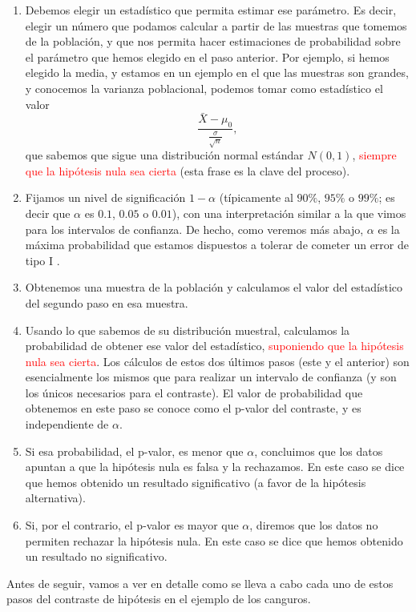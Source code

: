 \begin{itemize}
\begin{enumerate}
         \item  Debemos elegir un estadístico que permita estimar ese parámetro. Es decir, elegir un número que podamos calcular a partir de las muestras que tomemos de la población, y que nos permita hacer estimaciones de probabilidad sobre el parámetro que hemos elegido en el paso anterior. Por ejemplo, si hemos elegido la media, y estamos en un ejemplo en el que las muestras son grandes, y conocemos la varianza poblacional, podemos tomar como estadístico el valor
             \[\dfrac{\bar X-\mu_0}{\frac{\sigma}{\sqrt{n}}},\]
             que sabemos que sigue una distribución normal estándar $N(0,1)$, \textcolor{red}{\sf siempre que la hipótesis nula sea cierta} (esta frase es la clave del proceso).
         \item Fijamos un nivel de significación $1-\alpha$ (típicamente al $90\%$, $95\%$ o $99\%$; es decir que $\alpha$ es $0.1$, $0.05$ o $0.01$), con una interpretación similar a la que vimos para los intervalos de confianza. De hecho, como veremos más abajo, $\alpha$ es la máxima probabilidad que estamos dispuestos a tolerar de cometer un error de tipo I .
         \item Obtenemos una muestra de la población y calculamos el valor del estadístico del segundo paso en esa muestra.
         \item Usando lo que sabemos de su distribución muestral, calculamos la probabilidad de obtener ese valor del estadístico, \textcolor{red}{\sf suponiendo que la hipótesis nula sea cierta}. Los cálculos de estos dos últimos pasos (este y el anterior) son esencialmente los mismos que para realizar un intervalo de confianza (y son los únicos necesarios para el contraste). El valor de probabilidad que obtenemos en este paso se conoce como el {\sf p-valor del contraste}, y es independiente de $\alpha$.
         \item Si esa probabilidad, el p-valor, es menor que $\alpha$, concluimos que los datos apuntan a que la hipótesis nula es falsa y la {\sf rechazamos}. En este caso se dice que hemos obtenido un {\sf resultado significativo}  (a favor de la hipótesis alternativa).
        \item Si, por el contrario, el p-valor es mayor que $\alpha$, diremos que los datos no permiten rechazar la hipótesis nula. En este caso se dice que hemos obtenido un {\sf resultado no significativo}.
         \end{enumerate}

         Antes de seguir, vamos a ver en detalle como se lleva a cabo cada uno de estos pasos del contraste de hipótesis en el ejemplo de los canguros.


\end{itemize}
